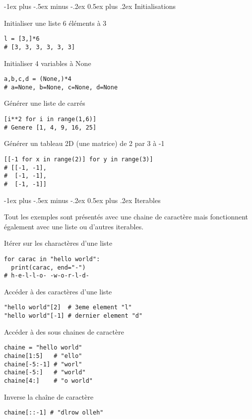 \documentclass[10pt,landscape]{article}
\makeatletter
\renewcommand{\section}{\@startsection{section}{1}{0mm}%
                                {-1ex plus -.5ex minus -.2ex}%
                                {0.5ex plus .2ex}%
                                {\normalfont\large\bfseries}}
\makeatother
\begin{document}
\begin{multicols}{3}
\section{Initialisations}

Initialiser une liste 6 éléments à 3
\begin{lstlisting}
l = [3,]*6
# [3, 3, 3, 3, 3, 3]
\end{lstlisting}

Initialiser 4 variables à None
\begin{lstlisting}
a,b,c,d = (None,)*4
# a=None, b=None, c=None, d=None
\end{lstlisting}

Générer une liste de carrés
\begin{lstlisting}
[i**2 for i in range(1,6)]
# Genere [1, 4, 9, 16, 25]
\end{lstlisting}

Générer un tableau 2D (une matrice) de 2 par 3 à -1

\begin{lstlisting}
[[-1 for x in range(2)] for y in range(3)]
# [[-1, -1],
#  [-1, -1],
#  [-1, -1]]
\end{lstlisting}

\section{Iterables}

Tout les exemples sont présentés avec une chaine de caractère mais fonctionnent également avec une liste ou d'autres iterables.

Itérer sur les charactères d'une liste
\begin{lstlisting}
for carac in "hello world":
  print(carac, end="-")
# h-e-l-l-o- -w-o-r-l-d-
\end{lstlisting}

Accéder à des caractères d'une liste
\begin{lstlisting}
"hello world"[2]  # 3eme element "l"
"hello world"[-1] # dernier element "d"
\end{lstlisting}

Accéder à des sous chaines de caractère
\begin{lstlisting}
chaine = "hello world"
chaine[1:5]   # "ello"
chaine[-5:-1] # "worl"
chaine[-5:]   # "world"
chaine[4:]    # "o world"
\end{lstlisting}

Inverse la chaîne de caractère
\begin{lstlisting}
chaine[::-1] # "dlrow olleh"
\end{lstlisting}


\end{multicols}
\end{document}
